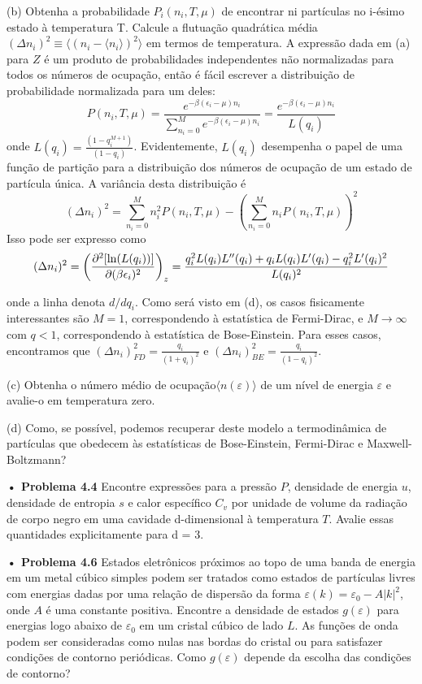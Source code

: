 \documentclass[12pt]{article}
\begin{document}
(b) Obtenha a probabilidade $P_i(n_i, T, μ)$ de encontrar ni partículas no i-ésimo estado à temperatura T. Calcule a flutuação quadrática média $(\Delta n_i)^2 \equiv \langle (n_i - \langle n_i \rangle)^2 \rangle$ em termos de temperatura.
A expressão dada em (a) para $Z$ é um produto de probabilidades independentes não normalizadas para todos os números de ocupação, então é fácil escrever a distribuição de probabilidade normalizada para um deles:
\[
P(n_i, T, \mu) = \frac{e^{-\beta (\epsilon_i - \mu) n_i}}{\sum_{n_i=0}^M e^{-\beta (\epsilon_i - \mu) n_i}} = \frac{e^{-\beta (\epsilon_i - \mu) n_i}}{L(q_i)}
\]
onde $L(q_i) = \frac{(1 - q_i^{M+1})}{(1 - q_i)}$. Evidentemente, $L(q_i) $ desempenha o papel de uma função de partição para a distribuição dos números de ocupação de um estado de partícula única. A variância desta distribuição é
\[
(\Delta n_i)^2 = \sum_{n_i = 0}^M n_i^2 P(n_i, T, \mu) - \left( \sum_{n_i = 0}^M n_i P(n_i, T, \mu) \right)^2
\]
Isso pode ser expresso como
\[
(\Delta n_i)^2 = \left( \frac{\partial^2 [\ln(L(q_i))]}{\partial (\beta \epsilon_i)^2} \right)_{z} 
= \frac{q_i^2 L(q_i) L''(q_i) + q_i L(q_i) L'(q_i) - q_i^2 L'(q_i)^2}{L(q_i)^2} \\
\]

onde a linha denota $d/dq_i$. Como será visto em (d), os casos fisicamente interessantes são $M = 1$, correspondendo à estatística de Fermi-Dirac, e $M \rightarrow \infty$ com $q < 1$, correspondendo à estatística de Bose-Einstein. Para esses casos, encontramos que $(\Delta n_i)^2_{FD} = \frac{q_i}{(1 + q_i)^2} \text{ e } (\Delta n_i)^2_{BE} = \frac{q_i}{(1 - q_i)^2}$.

 
(c) Obtenha o número médio de ocupação$ \langle n(\varepsilon) \rangle$ de um nível de energia $\varepsilon$ e avalie-o em temperatura zero.

(d) Como, se possível, podemos recuperar deste modelo a termodinâmica de partículas que obedecem às estatísticas de Bose-Einstein, Fermi-Dirac e Maxwell-Boltzmann?

\textbf{• Problema 4.4} Encontre expressões para a pressão $P$, densidade de energia $u$, densidade de entropia $s$ e calor específico $C_v$ por unidade de volume da radiação de corpo negro em uma cavidade d-dimensional à temperatura $T$. Avalie essas quantidades explicitamente para d = 3. 

\textbf{• Problema 4.6} Estados eletrônicos próximos ao topo de uma banda de energia em um metal cúbico simples podem ser tratados como estados de partículas livres com energias dadas por uma relação de dispersão da forma $\varepsilon (k) = \varepsilon_0 - A |k|^2$, onde $A$ é uma constante positiva. Encontre a densidade de estados $g(\varepsilon)$ para energias logo abaixo de $\varepsilon_0 $ em um cristal cúbico de lado $L$. As funções de onda podem ser consideradas como nulas nas bordas do cristal ou para satisfazer condições de contorno periódicas. Como $g(\varepsilon)$  depende da escolha das condições de contorno? 
 

 
\end{document}

